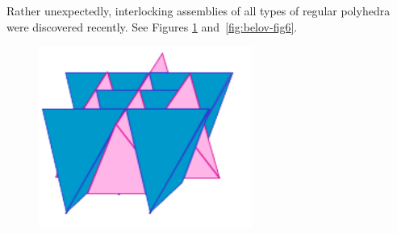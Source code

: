 Rather unexpectedly, interlocking assemblies of all types of regular
polyhedra were discovered recently. See Figures \ref{fig:belov-fig2}
and~\ref{fig:belov-fig6}.



\begin{figure}[ht]
\begin{center}
  \includegraphics[width=7cm]{Belov/belov-fig2}
\end{center}
\label{fig:belov-fig2}
\end{figure}

